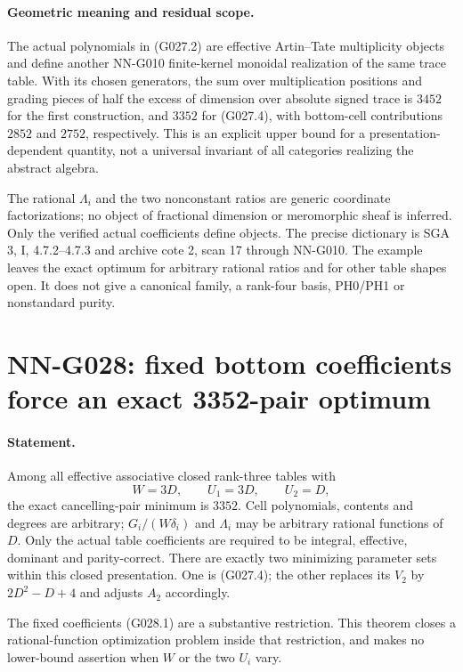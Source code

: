 \paragraph{Geometric meaning and residual scope.}
The actual polynomials in (G027.2) are effective
Artin--Tate multiplicity objects and define another
NN-G010 finite-kernel monoidal realization of the
same trace table. With its chosen generators, the
sum over multiplication positions and grading pieces
of half the excess of dimension over absolute signed
trace is $3452$ for the first construction, and $3352$
for (G027.4), with bottom-cell contributions $2852$
and $2752$, respectively.
This is an explicit upper bound for a presentation-dependent
quantity, not a universal invariant of all categories
realizing the abstract algebra.

The rational $\Lambda_i$ and the two nonconstant ratios
are generic coordinate factorizations; no object of
fractional dimension or meromorphic sheaf is inferred.
Only the verified actual coefficients define objects.
The precise dictionary is SGA 3, I, 4.7.2--4.7.3 and
archive cote 2, scan 17 through NN-G010. The example
leaves the exact optimum for arbitrary rational ratios
and for other table shapes open. It does not give a
canonical family, a rank-four basis, PH0/PH1 or
nonstandard purity.



\section{NN-G028: fixed bottom coefficients force an exact 3352-pair optimum}
\paragraph{Statement.}
Among all effective associative closed rank-three tables with
\[
 W=3D,\qquad U_1=3D,\qquad U_2=D,                    \tag{G028.1}
\]
the exact cancelling-pair minimum is $3352$.
Cell polynomials, contents and degrees are arbitrary;
$G_i/(W\delta_i)$ and $\Lambda_i$ may be arbitrary
rational functions of $D$. Only the actual table
coefficients are required to be integral, effective,
dominant and parity-correct. There are exactly two
minimizing parameter sets within this closed presentation.
One is (G027.4); the other replaces its $V_2$ by
$2D^2-D+4$ and adjusts $A_2$ accordingly.

The fixed coefficients (G028.1) are a substantive
restriction. This theorem closes a rational-function
optimization problem inside that restriction, and
makes no lower-bound assertion when $W$ or the two
$U_i$ vary.

